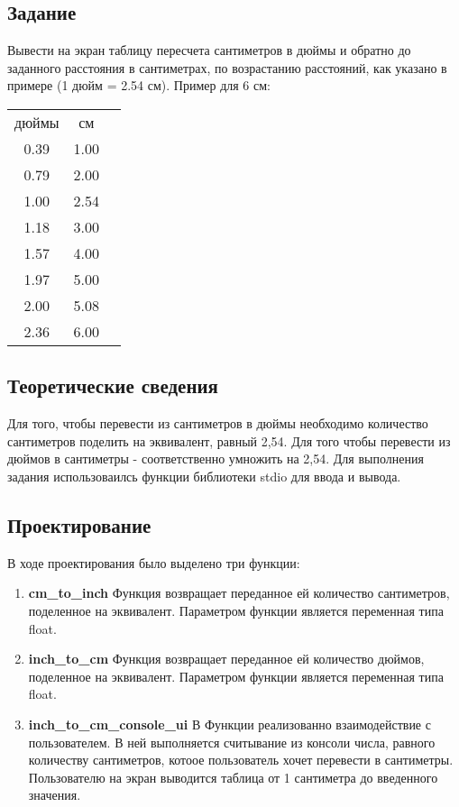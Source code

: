 \documentclass[12pt,a4paper]{report}
\begin{document}
\subsection{Задание}
\hspace{\parindent}
Вывести на экран таблицу пересчета сантиметров в дюймы и обратно до заданного расстояния в сантиметрах, по возрастанию расстояний, как указано в примере (1 дюйм = 2.54 см). Пример для 6 см:
	
\begin{center}
\begin{tabular}{ccc}
	дюймы  &  см \\
	0.39 &  1.00 \\
	0.79 &  2.00 \\
	1.00 &  2.54 \\
	1.18 &  3.00 \\
	1.57 &  4.00 \\
	1.97 &  5.00 \\
	2.00 &  5.08 \\
	2.36 &  6.00\\
\end{tabular}
\end{center}	
	
\subsection{Теоретические сведения}
\hspace{\parindent}
Для того, чтобы перевести из сантиметров в дюймы необходимо количество сантиметров поделить на эквивалент, равный 2,54. Для того чтобы перевести из дюймов в сантиметры - соответственно умножить на 2,54.
	Для выполнения задания использоваилсь функции библиотеки stdio для ввода и вывода.
	
\subsection{Проектирование}
\hspace{\parindent}
В ходе проектирования было выделено три функции:
\begin{enumerate}
	\item \textbf{cm\_to\_inch}
	Функция возвращает переданное ей количество сантиметров, поделенное на эквивалент.
	Параметром функции является переменная типа float.
	\item \textbf{inch\_to\_cm}
	Функция возвращает переданное ей количество дюймов, поделенное на эквивалент.
	Параметром функции является переменная типа float.	
	\item \textbf{inch\_to\_cm\_console\_ui}
	В  Функции реализованно взаимодействие с пользователем. В ней выполняется считывание из консоли числа, равного количеству сантиметров, котоое пользователь хочет перевести в сантиметры. Пользователю на экран выводится таблица от 1 сантиметра до введенного значения.	
\end{enumerate}
\end{document}
